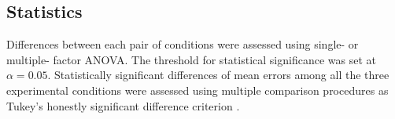 



\subsection{Statistics}
Differences between each pair of conditions were assessed using single- or multiple- factor
ANOVA. The threshold for statistical significance was set at $\alpha =
0.05$. Statistically significant differences of mean errors among all the three
experimental conditions were assessed using multiple comparison procedures as Tukey's honestly significant difference criterion \citep{Hochberg}.